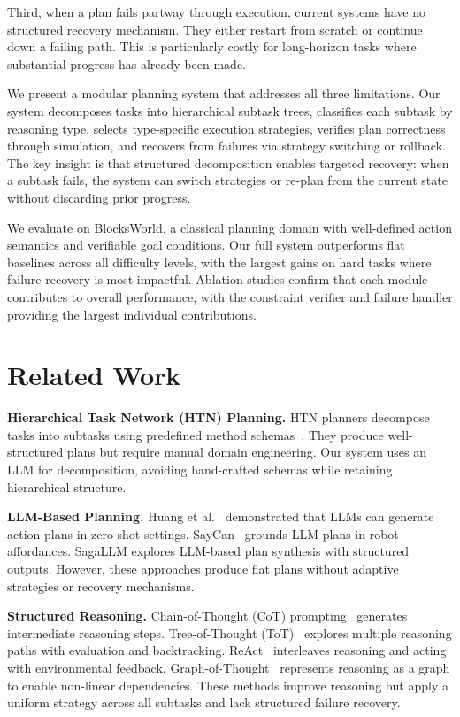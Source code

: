 \documentclass{article}
\begin{document}
Third, when a plan fails partway through execution, current systems have no structured recovery mechanism. They either restart from scratch or continue down a failing path. This is particularly costly for long-horizon tasks where substantial progress has already been made.

We present a modular planning system that addresses all three limitations. Our system decomposes tasks into hierarchical subtask trees, classifies each subtask by reasoning type, selects type-specific execution strategies, verifies plan correctness through simulation, and recovers from failures via strategy switching or rollback. The key insight is that structured decomposition enables targeted recovery: when a subtask fails, the system can switch strategies or re-plan from the current state without discarding prior progress.

We evaluate on BlocksWorld, a classical planning domain with well-defined action semantics and verifiable goal conditions. Our full system outperforms flat baselines across all difficulty levels, with the largest gains on hard tasks where failure recovery is most impactful. Ablation studies confirm that each module contributes to overall performance, with the constraint verifier and failure handler providing the largest individual contributions.

\section{Related Work}

\textbf{Hierarchical Task Network (HTN) Planning.} HTN planners decompose tasks into subtasks using predefined method schemas~\citep{erol1994htn}. They produce well-structured plans but require manual domain engineering. Our system uses an LLM for decomposition, avoiding hand-crafted schemas while retaining hierarchical structure.

\textbf{LLM-Based Planning.} Huang et al.~\citep{huang2022language} demonstrated that LLMs can generate action plans in zero-shot settings. SayCan~\citep{ahn2022saycan} grounds LLM plans in robot affordances. SagaLLM explores LLM-based plan synthesis with structured outputs. However, these approaches produce flat plans without adaptive strategies or recovery mechanisms.

\textbf{Structured Reasoning.} Chain-of-Thought (CoT) prompting~\citep{wei2022chain} generates intermediate reasoning steps. Tree-of-Thought (ToT)~\citep{yao2023tree} explores multiple reasoning paths with evaluation and backtracking. ReAct~\citep{yao2023react} interleaves reasoning and acting with environmental feedback. Graph-of-Thought~\citep{besta2023graph} represents reasoning as a graph to enable non-linear dependencies. These methods improve reasoning but apply a uniform strategy across all subtasks and lack structured failure recovery.
\end{document}
